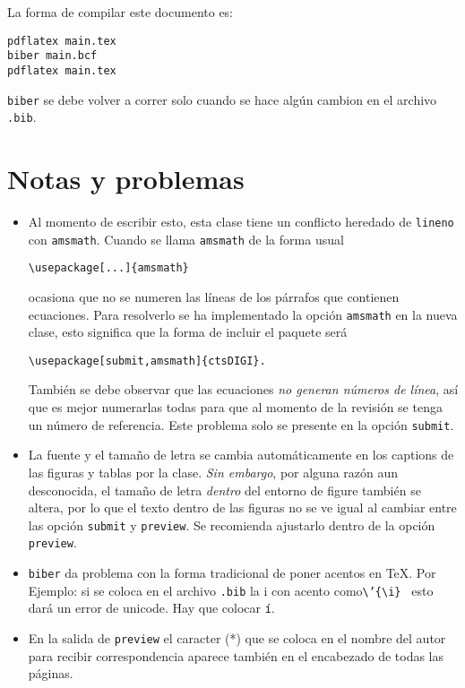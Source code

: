 \documentclass[preview]{ctsDIGI}
\begin{document}
La forma de compilar este documento es:
\begin{verbatim}
pdflatex main.tex
biber main.bcf
pdflatex main.tex
\end{verbatim}
\texttt{biber} se debe volver a correr solo cuando se hace algún cambion en el archivo \texttt{.bib}.

\section{Notas y problemas}
\begin{itemize}
\item Al momento de escribir esto, esta clase tiene un conflicto heredado de \texttt{lineno} con  \texttt{amsmath}. Cuando se llama \texttt{amsmath} de la forma usual
\begin{verbatim}
\usepackage[...]{amsmath}
\end{verbatim}
ocasiona que no se numeren las líneas de los párrafos que contienen ecuaciones. Para resolverlo se ha implementado la opción \texttt{amsmath} en la nueva clase, esto significa que la forma de incluir el paquete será
\begin{verbatim}
\usepackage[submit,amsmath]{ctsDIGI}.
\end{verbatim}
También se debe observar que las ecuaciones \emph{no generan números de línea}, así que es mejor numerarlas todas para que al momento de la revisión se tenga un número de referencia. Este problema solo se presente en la opción \texttt{submit}.

\item La fuente y el tamaño de letra se cambia automáticamente en los captions de las figuras y tablas por la clase. \emph{Sin embargo}, por alguna razón aun desconocida, el tamaño de letra \emph{dentro} del entorno de figure también se altera, por lo que el texto dentro de las figuras no se ve igual al cambiar entre las opción \texttt{submit} y \texttt{preview}. Se recomienda ajustarlo dentro de la opción \texttt{preview}.

\item \texttt{biber} da problema con la forma tradicional de poner acentos en \TeX. Por Ejemplo: si se coloca en el archivo \texttt{.bib} la i con acento como\texttt{\textbackslash'\{\textbackslash i\} } esto dará un error de unicode. Hay que colocar \texttt{í}.

\item En la salida de \texttt{preview} el caracter (*) que se coloca en el nombre del autor para recibir correspondencia aparece también en el encabezado de todas las páginas.

\end{itemize}
\end{document}
